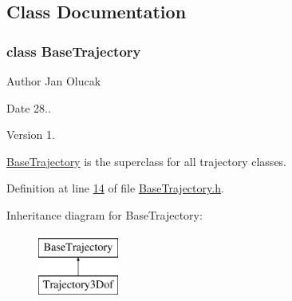 \subsection{Class Documentation}
\label{class_base_trajectory}
\subsubsection{class Base\+Trajectory}
\begin{DoxyAuthor}{Author}
Jan Olucak 
\end{DoxyAuthor}
\begin{DoxyDate}{Date}
28.. 
\end{DoxyDate}
\begin{DoxyVersion}{Version}
1.
\end{DoxyVersion}
\hyperlink{group___trajectory_class_base_trajectory}{Base\+Trajectory} is the superclass for all trajectory classes. 

Definition at line \hyperlink{_base_trajectory_8h_source_l00014}{14} of file \hyperlink{_base_trajectory_8h_source}{Base\+Trajectory.\+h}.

Inheritance diagram for Base\+Trajectory\+:\begin{figure}[H]
\begin{center}
\leavevmode
\includegraphics[height=2.000000cm]{group___trajectory}
\end{center}
\end{figure}
